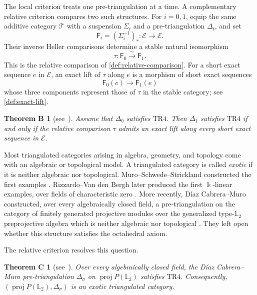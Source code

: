 \documentclass[a4paper,11pt,reqno]{amsart}
\theoremstyle{definition}
\theoremstyle{plain}
\newtheorem*{maintheoremb}{Theorem B}
\newtheorem*{maintheoremc}{Theorem C}
\numberwithin{equation}{section}
\newcommand{\T}{\mathcal T}
\newcommand{\kk}{\Bbbk}
\begin{document}
The local criterion treats one pre-triangulation at a time.  A complementary
relative criterion compares two such structures.  For \(i=0,1\), equip the
same additive category \(\T\) with a suspension \(\Sigma_i\) and a
pre-triangulation \(\Delta_i\), and set
\[
 \mathsf F_i=(\Sigma_i^{-1})_*:\mathcal E\longrightarrow\mathcal E.
\]
Their inverse Heller comparisons determine a stable natural isomorphism
\[
 \tau:\mathsf F_0\xrightarrow{\sim}\mathsf F_1.
\]
This is the relative comparison of \cref{def:relative-comparison}.
For a short exact sequence $e$ in $\mathcal E$, an exact lift of $\tau$
along $e$ is a morphism of short exact sequences
\[
 \mathsf F_0(e)\longrightarrow\mathsf F_1(e)
\]
whose three components represent those of $\tau$ in the stable category;
see \cref{def:exact-lift}.

\begin{maintheoremb}[{\normalfont see~}]
Assume that $\Delta_0$ satisfies $\mathrm{TR4}$.  Then $\Delta_1$
satisfies $\mathrm{TR4}$ if and only if the relative comparison $\tau$
admits an exact lift along every short exact sequence in $\mathcal E$.
\end{maintheoremb}

Most triangulated categories arising in algebra, geometry, and topology
come with an algebraic or topological model.  A triangulated category is
called \emph{exotic} if it is neither algebraic nor topological.
Muro--Schwede--Strickland constructed the first examples
\cite{MuroSchwedeStrickland2007}.  Rizzardo--Van den Bergh later produced
the first $\kk$-linear examples, over fields of characteristic zero
\cite{RizzardoVandenBergh2020}.  More recently, D\'iaz Cabrera--Muro
constructed, over every algebraically closed field, a pre-triangulation on
the category of finitely generated projective modules over the generalized
type-$\mathbb L_2$ preprojective algebra which is neither algebraic nor
topological \cite{DiazCabreraMuro2026}.  They left open whether this
structure satisfies the octahedral axiom.

The relative criterion resolves this question.

\begin{maintheoremc}[{\normalfont see~}]
Over every algebraically closed field, the D\'iaz Cabrera--Muro
pre-triangulation $\Delta_\sigma$ on
$\operatorname{proj}P(\mathbb L_2)$ satisfies $\mathrm{TR4}$.
Consequently,
$(\operatorname{proj}P(\mathbb L_2),\Delta_\sigma)$ is an exotic
triangulated category.
\end{maintheoremc}
\end{document}
